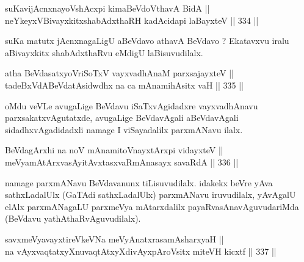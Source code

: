 \begin{shl}
suKavijAcnxnayoVshAcxpi kimaBeVdoV\s thavA BidA || \\
neYkeyxV\s BivayxkitxshabAdxthaRH kadAcidapi laBayxteV ||  334 ||  
\end{shl}

\begin{artha}
suKa matutx jAcnxnagaLigU aBeVdavo athavA BeVdavo ? Ekatavxvu iralu
aBivayxkitx shabAdxthaRvu eMdigU laBisuvudilalx.
\end{artha}

\begin{shl}
\footnotemark[1]atha BeVdasatxyoVriSoTxV vayxvadhAnaM parxsajayxteV || \\
tadeBxVdABeVdatAsidwdhx na ca mAnamihAsitx vaH ||  335 ||  
\end{shl}

\begin{artha}
oMdu veVLe avugaLige BeVdavu iSaTxvAgidadxre vayxvadhAnavu
parxsakatxvAgutatxde, avugaLige BeVdavAgali aBeVdavAgali
sidadhxvAgadidadxli namage I viSayadalilx parxmANavu ilalx.
\end{artha}

\begin{shl}
BeVdagArxhi na noV mAnamitoV\s nayxtArxpi vidayxteV || \\
meVyamAtArxvasAyitAvxtasxvaRmAnasayx savaRdA ||  336 ||  
\end{shl}

\begin{artha}
namage parxmANavu BeVdavanunx tiLisuvudilalx. idakekx beVre yAva
sathxLadalUlx (GaTAdi sathxLadalUlx) parxmANavu iruvudilalx, yAvAgalU
elAlx parxmANagaLU parxmeVya mAtarxdalilx payaRvasAnavAguvudariMda
(BeVdavu yathAthaRvAguvudilalx).
\end{artha}

\begin{shl}
savxmeVyavayxtireVkeVNa meVyAnatxrasamAsharxyaH || \\
na \footnotemark[1]vAyxvaqtatxyXnuvaqtAtxyXdivAyxpAroV\s sitx miteVH kicxtf ||  337 ||  
\end{shl}

